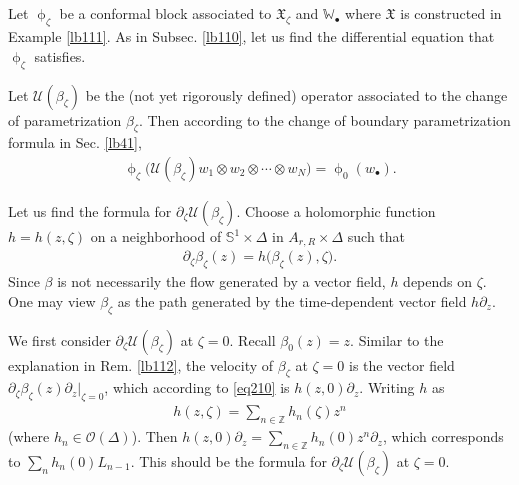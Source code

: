 \documentclass[12pt,a4paper,notitlepage]{article}
\theoremstyle{definition}
\theoremstyle{plain}
\newcommand{\fk}{\mathfrak}
\newcommand{\mc}{\mathcal}
\newcommand{\scr}{\mathscr}
\newcommand{\blt}{\bullet}
\newcommand{\Wbb}{\mathbb W}
\newcommand{\Zbb}{\mathbb Z}
\newcommand{\Sbb}{{\mathbb S}}
\numberwithin{equation}{section}
\begin{document}
\subsection{}\label{lb116}

Let $\upphi_\zeta$ be a conformal block associated to $\fk X_\zeta$ and $\Wbb_\blt$ where $\fk X$ is constructed in Example \ref{lb111}. As in Subsec. \ref{lb110}, let us find the differential equation that $\upphi_\zeta$ satisfies.

Let $\mc U(\beta_\zeta)$ be the (not yet rigorously defined) operator associated to the change of parametrization $\beta_\zeta$. Then according to the change of boundary parametrization formula in Sec. \ref{lb41}, 
\begin{align}
\upphi_\zeta\big(\mc U(\beta_\zeta)w_1\otimes w_2\otimes\cdots\otimes w_N\big)=\upphi_0(w_\blt).\label{eq211}
\end{align}

Let us find the formula for $\partial_\zeta\mc U(\beta_\zeta)$. Choose a holomorphic function $h=h(z,\zeta)$ on a neighborhood of $\Sbb^1\times\Delta$ in $A_{r,R}\times\Delta$ such that 
\begin{align}
\partial_\zeta\beta_\zeta(z)=h\big(\beta_\zeta(z),\zeta\big).\label{eq210}
\end{align}
Since $\beta$ is not necessarily the flow generated by a vector field, $h$ depends on $\zeta$. One may view $\beta_\zeta$ as the path generated by the time-dependent vector field $h\partial_z$.

We first consider $\partial_\zeta\mc U(\beta_\zeta)$ at $\zeta=0$. Recall $\beta_0(z)=z$. Similar to the explanation in Rem. \ref{lb112}, the velocity of $\beta_\zeta$ at $\zeta=0$ is the vector field $\partial_\zeta\beta_\zeta(z)\partial_z\big|_{\zeta=0}$, which according to \eqref{eq210} is $h(z,0)\partial_z$. Writing $h$ as
\begin{align}
h(z,\zeta)=\sum_{n\in\Zbb}h_n(\zeta)z^n\label{eq216}
\end{align}
(where $h_n\in\scr O(\Delta)$). Then $h(z,0)\partial_z=\sum_{n\in\Zbb}h_n(0)z^n\partial_z$, which corresponds to $\sum_n h_n(0)L_{n-1}$. This should be the formula for $\partial_\zeta \mc U(\beta_\zeta)$ at $\zeta=0$.
\end{document}
